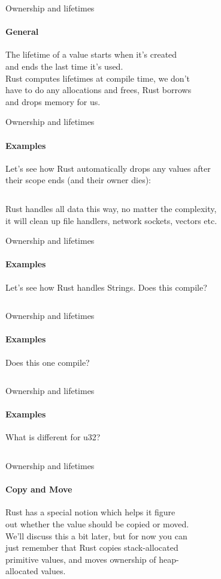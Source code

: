 \documentclass[usenames,dvipsnames,10pt,aspectratio=169]{beamer}
\begin{document}
\begin{frame}{Ownership and lifetimes}
	\framesubtitle{General}
	\large
	The lifetime of a value starts when it’s created\\
	and ends the last time it’s used.\\
	\vspace{0.2cm}
	Rust computes lifetimes at compile time, we don't\\
	have to do any allocations and frees, Rust borrows\\
	and drops memory for us.
\end{frame}

\begin{frame}{Ownership and lifetimes}
	\framesubtitle{Examples}
	Let's see how Rust automatically drops any values after\\
	their scope ends (and their owner dies):
	\vspace{0.3cm}
	\inputminted[fontsize=\large]{rust}{code/own1.rs}
	\vspace{0.3cm}
	Rust handles all data this way, no matter the complexity,\\
	it will clean up file handlers, network sockets, vectors etc.
\end{frame}

\begin{frame}{Ownership and lifetimes}
	\framesubtitle{Examples}
	\large
	Let's see how Rust handles \textcolor{ucuyellow}{String}s. Does this compile?
	\vspace{0.6cm}
	\inputminted[fontsize=\large]{rust}{code/own2.rs}
\end{frame}

\begin{frame}{Ownership and lifetimes}
	\framesubtitle{Examples}
	\large
	Does this one compile?
	\vspace{0.6cm}
	\inputminted[fontsize=\large]{rust}{code/own3.rs}
\end{frame}

\begin{frame}{Ownership and lifetimes}
	\framesubtitle{Examples}
	\large
	What is different for \textcolor{ucuyellow}{u32}?
	\vspace{0.6cm}
	\inputminted[fontsize=\large]{rust}{code/own4.rs}
\end{frame}

\begin{frame}{Ownership and lifetimes}
	\framesubtitle{Copy and Move}
	\large
	Rust has a special notion which helps it figure\\
	out whether the value should be copied or moved.\\
	\vspace{0.5cm}
	We'll discuss this a bit later, but for now you	can\\
	just remember that Rust copies stack-allocated\\
	primitive values, and moves ownership of heap-\\
	allocated values.
	
\end{frame}
\end{document}
